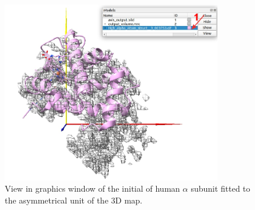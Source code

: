   \begin{figure}[H]
  \centering 
  \captionsetup{width=.9\linewidth} 
  \includegraphics[width=0.85\textwidth]{Images/Fig23}
  \caption{View in \chimera graphics window of the initial  of human  $\alpha$ subunit fitted to the asymmetrical unit of the 3D map.}
  \label{fig:chimera_fit_results_2}
  \end{figure}

 
